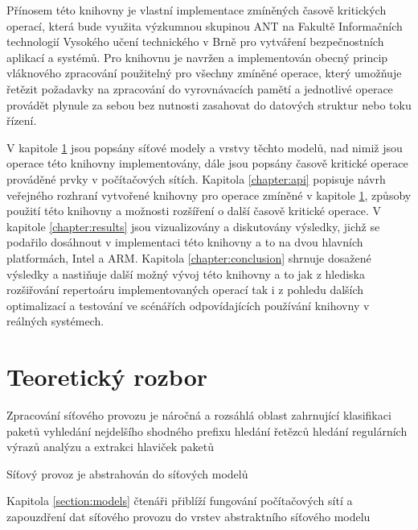 Přínosem této knihovny je vlastní implementace zmíněných časově kritických operací, která bude
využita výzkumnou skupinou ANT na Fakultě Informačních technologií Vysokého učení technického v Brně
pro vytváření bezpečnostních aplikací a systémů.
Pro knihovnu je navržen a implementován obecný princip vláknového zpracování použitelný pro všechny
zmíněné operace, který umožňuje řetězit požadavky na zpracování do vyrovnávacích pamětí a jednotlivé operace
provádět plynule za sebou bez nutnosti zasahovat do datových struktur nebo toku řízení.

V kapitole \ref{chapter:theoretical} jsou popsány síťové modely a vrstvy těchto modelů,
nad nimiž jsou operace této knihovny implementovány, dále jsou popsány časově kritické operace prováděné
prvky v počítačových sítích. Kapitola \ref{chapter:api} popisuje návrh veřejného rozhraní vytvořené knihovny
pro operace zmíněné v kapitole \ref{chapter:theoretical}, způsoby použití této knihovny a možnosti rozšíření
o další časově kritické operace. V kapitole \ref{chapter:results} jsou vizualizovány a diskutovány
výsledky, jichž se podařilo dosáhnout v implementaci této knihovny a to na dvou hlavních platformách, Intel a ARM.
Kapitola \ref{chapter:conclusion} shrnuje dosažené výsledky a nastiňuje další možný vývoj této knihovny
a to jak z hlediska rozšiřování repertoáru implementovaných operací tak i z pohledu dalších optimalizací
a testování ve scénářích odpovídajících používání knihovny v reálných systémech.

\chapter{Teoretický rozbor}\label{chapter:theoretical} %

Zpracování síťového provozu je náročná a rozsáhlá oblast zahrnující
klasifikaci paketů
vyhledání nejdelšího shodného prefixu
hledání řetězců
hledání regulárních výrazů
analýzu a extrakci hlaviček paketů

Síťový provoz je abstrahován do síťových modelů

Kapitola \ref{section:models} čtenáři přiblíží fungování počítačových sítí a zapouzdření dat síťového
provozu do vrstev abstraktního síťového modelu


